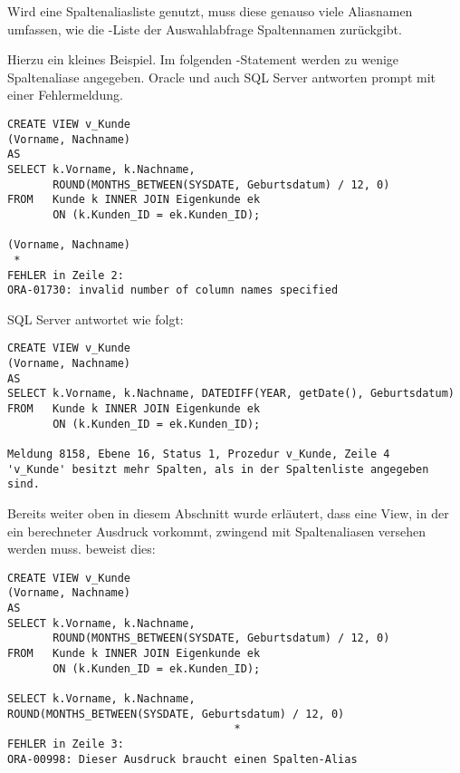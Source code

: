         \begin{merke}
          Wird eine Spaltenaliasliste genutzt, muss diese genauso viele Aliasnamen umfassen, wie die \SELECT-Liste der Auswahlabfrage Spaltennamen zurückgibt.
        \end{merke}
        Hierzu ein kleines Beispiel. Im folgenden -Statement werden zu wenige Spaltenaliase angegeben. Oracle und auch SQL Server antworten prompt mit einer Fehlermeldung.
        \begin{lstlisting}[language=oracle_sql,caption={Eine einfache View mit fehlerhafter Spaltenaliasliste in Oracle},label=sql08_31]
CREATE VIEW v_Kunde
(Vorname, Nachname)
AS
SELECT k.Vorname, k.Nachname,
       ROUND(MONTHS_BETWEEN(SYSDATE, Geburtsdatum) / 12, 0)
FROM   Kunde k INNER JOIN Eigenkunde ek
       ON (k.Kunden_ID = ek.Kunden_ID);

(Vorname, Nachname)
 *
FEHLER in Zeile 2:
ORA-01730: invalid number of column names specified
        \end{lstlisting}
        SQL Server antwortet wie folgt:
        \begin{lstlisting}[language=ms_sql,caption={Eine einfache View mit fehlerhafter Spaltenaliasliste in SQL Server},label=sql08_32]
CREATE VIEW v_Kunde
(Vorname, Nachname)
AS
SELECT k.Vorname, k.Nachname, DATEDIFF(YEAR, getDate(), Geburtsdatum)
FROM   Kunde k INNER JOIN Eigenkunde ek
       ON (k.Kunden_ID = ek.Kunden_ID);

Meldung 8158, Ebene 16, Status 1, Prozedur v_Kunde, Zeile 4
'v_Kunde' besitzt mehr Spalten, als in der Spaltenliste angegeben sind.
        \end{lstlisting}
        Bereits weiter oben in diesem Abschnitt wurde erläutert, dass eine View, in der ein berechneter Ausdruck vorkommt, zwingend mit Spaltenaliasen versehen werden muss.  beweist dies:
        \begin{lstlisting}[language=oracle_sql,caption={Eine View mit einer berechneten Spalte in Oracle},label=sql08_33]
CREATE VIEW v_Kunde
(Vorname, Nachname)
AS
SELECT k.Vorname, k.Nachname,
       ROUND(MONTHS_BETWEEN(SYSDATE, Geburtsdatum) / 12, 0)
FROM   Kunde k INNER JOIN Eigenkunde ek
       ON (k.Kunden_ID = ek.Kunden_ID);

SELECT k.Vorname, k.Nachname,
ROUND(MONTHS_BETWEEN(SYSDATE, Geburtsdatum) / 12, 0)
                                   *
FEHLER in Zeile 3:
ORA-00998: Dieser Ausdruck braucht einen Spalten-Alias
        \end{lstlisting}
